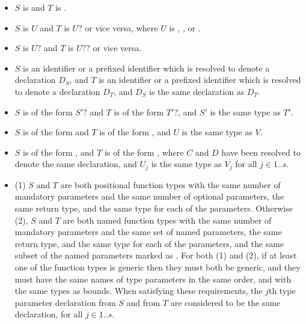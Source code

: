\documentclass[makeidx]{article}
\begin{document}
{\begin{itemize}
\item $S$ is \VOID{} and $T$ is \VOID.
\item $S$ is $U$ and $T$ is $U?$ or vice versa, where $U$ is \VOID,
  , or .
\item $S$ is $U?$ and $T$ is $U??$ or vice versa.
\item $S$ is an identifier or a prefixed identifier which is resolved
  to denote a declaration $D_S$,
  and $T$ is an identifier or a prefixed identifier which is resolved
  to denote a declaration $D_T$,
  and $D_S$ is the same declaration as  $D_T$.
\item $S$ is of the form $S'?$ and $T$ is of the form $T'?$,
  and $S'$ is the same type as $T'$.
\item $S$ is of the form 
  and $T$ is of the form ,
  and $U$ is the same type as $V$.
\item $S$ is of the form ,
  and $T$ is of the form ,
  where $C$ and $D$ have been resolved to denote the same declaration,
  and $U_j$ is the same type as $V_j$ for all $j \in 1 .. s$.
\item (1) $S$ and $T$ are both positional function types with the same
  number of mandatory parameters and the same number of optional parameters,
  the same return type, and the same type for each of the parameters.
  Otherwise (2), $S$ and $T$ are both named function types with the same
  number of mandatory parameters and the same set of named parameters,
  the same return type, and the same type for each of the parameters,
  and the same subset of the named parameters marked as \REQUIRED.
  For both (1) and (2), if at least one of the function types is generic
  then they must both be generic,
  and they must have the same names of type parameters in the same order,
  and with the same types as bounds.
  When satisfying these requirements,
  the $j$th type parameter declaration from $S$ and from $T$
  are considered to be the same declaration, for all $j \in 1 .. s$.

\end{itemize}}
\end{document}
